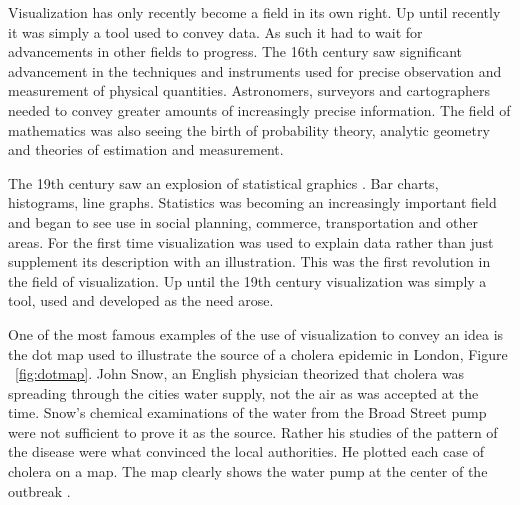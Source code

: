 \documentclass[a4paper, 10pt, titlepage, twocolumn, onehalfspace]{article}
\begin{document}
Visualization has only recently become a field in its own right. Up until recently it was simply a tool used to convey data. As such it had to wait for advancements in other fields to progress. The 16th century saw significant advancement in the techniques and instruments used for precise observation and measurement of physical quantities. Astronomers, surveyors and cartographers needed to convey greater amounts of increasingly precise information. The field of mathematics was also seeing the birth of probability theory, analytic geometry and theories of estimation and measurement.

The 19th century saw an explosion of statistical graphics \cite{friendly2001milestones}. Bar charts, histograms, line graphs. Statistics was becoming an increasingly important field and began to see use in social planning, commerce, transportation and other areas. For the first time visualization was used to explain data rather than just supplement its description with an illustration. This was the first revolution in the field of visualization. Up until the 19th century visualization was simply a tool, used and developed as the need arose.

One of the most famous examples of the use of visualization to convey an idea is the dot map used to illustrate the source of a cholera epidemic in London, Figure ~\ref{fig:dotmap}. John Snow, an English physician theorized that cholera was spreading through the cities water supply, not the air as was accepted at the time. Snow's chemical examinations of the water from the Broad Street pump were not sufficient to prove it as the source. Rather his studies of the pattern of the disease were what convinced the local authorities. He plotted each case of cholera on a map. The map clearly shows the water pump at the center of the outbreak \cite{frerichs2007ghost}.
\end{document}
